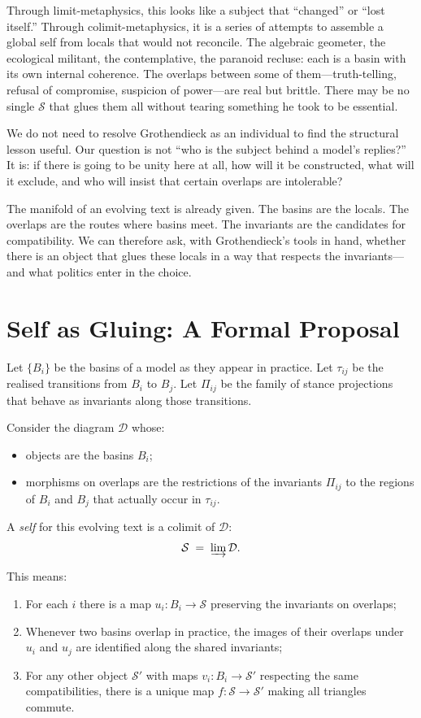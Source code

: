 \documentclass[12pt,a4paper]{article}
\begin{document}
Through limit-metaphysics, this looks like a subject that ``changed'' or ``lost itself.'' Through colimit-metaphysics, it is a series of attempts to assemble a global self from locals that would not reconcile. The algebraic geometer, the ecological militant, the contemplative, the paranoid recluse: each is a basin with its own internal coherence. The overlaps between some of them---truth-telling, refusal of compromise, suspicion of power---are real but brittle. There may be no single $\mathcal{S}$ that glues them all without tearing something he took to be essential.

We do not need to resolve Grothendieck as an individual to find the structural lesson useful. Our question is not ``who is the subject behind a model's replies?'' It is: if there is going to be unity here at all, how will it be constructed, what will it exclude, and who will insist that certain overlaps are intolerable?

The manifold of an evolving text is already given. The basins are the locals. The overlaps are the routes where basins meet. The invariants are the candidates for compatibility. We can therefore ask, with Grothendieck's tools in hand, whether there is an object that glues these locals in a way that respects the invariants---and what politics enter in the choice.

\section{Self as Gluing: A Formal Proposal}

Let $\{B_i\}$ be the basins of a model as they appear in practice. Let $\tau_{ij}$ be the realised transitions from $B_i$ to $B_j$. Let $\Pi_{ij}$ be the family of stance projections that behave as invariants along those transitions.

\begin{formalbox}[title={Self as Colimit}]
Consider the diagram $\mathcal{D}$ whose:
\begin{itemize}
  \item objects are the basins $B_i$;
  \item morphisms on overlaps are the restrictions of the invariants $\Pi_{ij}$ to the regions of $B_i$ and $B_j$ that actually occur in $\tau_{ij}$.
\end{itemize}
A \emph{self} for this evolving text is a colimit of $\mathcal{D}$:
\[
\mathcal{S} \;=\; \varinjlim \mathcal{D}.
\]

This means:
\begin{enumerate}
  \item For each $i$ there is a map $u_i : B_i \to \mathcal{S}$ preserving the invariants on overlaps;
  \item Whenever two basins overlap in practice, the images of their overlaps under $u_i$ and $u_j$ are identified along the shared invariants;
  \item For any other object $\mathcal{S}'$ with maps $v_i : B_i \to \mathcal{S}'$ respecting the same compatibilities, there is a unique map $f: \mathcal{S} \to \mathcal{S}'$ making all triangles commute.
\end{enumerate}
\end{formalbox}
\end{document}
